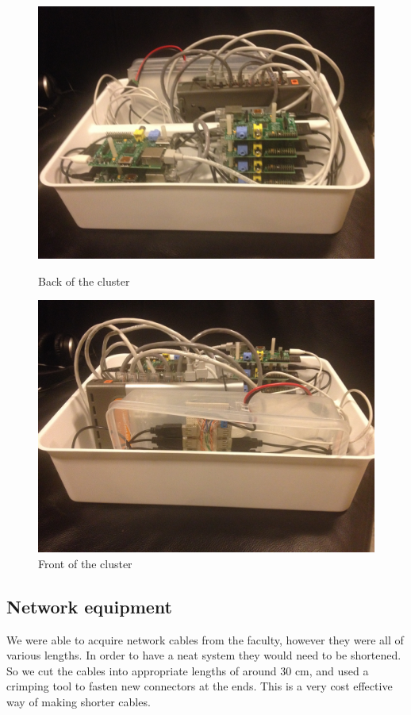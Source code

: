 \begin{figure}[ht]
\centering
\begin{minipage}[b]{0.45\linewidth}
    \includegraphics[width=1\textwidth]{thebuild/cluster_back.jpg}
    \caption{Back of the cluster}
    \label{fig:minipage1}
\end{minipage}
\quad
\begin{minipage}[b]{0.45\linewidth}
    \includegraphics[width=1\textwidth]{thebuild/cluster_front.jpg}
    \caption{Front of the cluster}
    \label{fig:minipage2}
\end{minipage}
\end{figure}

\subsection{Network equipment}
We were able to acquire network cables from the faculty, however they were all of various lengths. In order to have a neat system they would need to be shortened. So we cut the cables into appropriate lengths of around 30 cm, and used a crimping tool to fasten new connectors at the ends. This is a very cost effective way of making shorter cables. 


